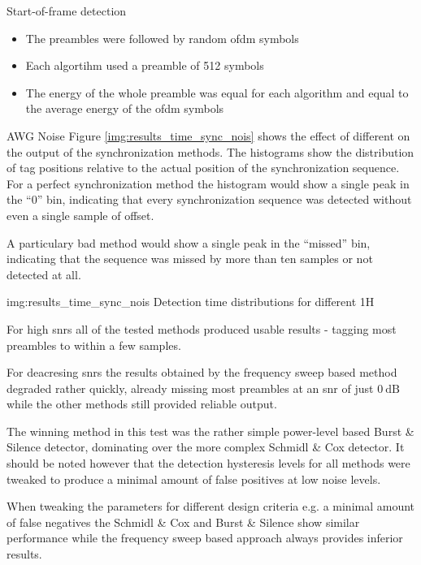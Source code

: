 \begin{subchapter}{Start-of-frame detection}
  \begin{itemize}
    \item
      The preambles were followed by random \gls{ofdm} symbols

    \item
      Each algortihm used a preamble of 512 symbols

    \item
      The energy of the whole preamble was equal for each
      algorithm and equal to the average energy of the \gls{ofdm}
      symbols
  \end{itemize}

  \begin{subsubchapter}{AWG Noise}
    Figure \ref{img:results_time_sync_nois} shows the effect of
    different  on the output of the synchronization
    methods.
    The histograms show the distribution of tag positions
    relative to the actual position of the synchronization
    sequence.
    For a perfect synchronization method the histogram would
    show a single peak in the ``$0$'' bin, indicating that every
    synchronization sequence was detected without even a single
    sample of offset.

    A particulary bad method would show a single peak in the
    ``missed'' bin, indicating that the sequence was missed by
    more than ten samples or not detected at all.

                 {img:results_time_sync_nois}
                 {Detection time distributions for different }
                 {1}{H}

    For high \glspl{snr} all of the tested methods produced
    usable results - tagging most preambles to within a few
    samples.

    For deacresing \glspl{snr} the results obtained by the
    frequency sweep based method degraded rather quickly,
    already missing most
    preambles at an \gls{snr} of just $\SI{0}{\deci\bel}$
    while the other methods still provided reliable output.

    The winning method in this test was the rather simple
    power-level based Burst \& Silence detector, dominating
    over the more complex Schmidl \& Cox detector.
    It should be noted however that the detection hysteresis levels
    for all methods were tweaked to produce a minimal amount
    of false positives at low noise levels.

    When tweaking the parameters for different design criteria
    e.g. a minimal amount of false negatives the Schmidl \& Cox
    and Burst \& Silence show similar performance while
    the frequency sweep based approach always provides inferior
    results.
  \end{subsubchapter}


\end{subchapter}
